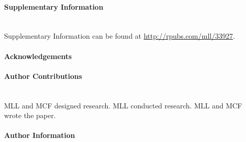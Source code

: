\documentclass[12pt]{article}
\renewcommand\refname{References and Notes}
\newcounter{lastnote}
\begin{document}
\renewcommand{\refname}{\normalsize References}



\paragraph*{Supplementary Information}\mbox{}\\
Supplementary Information can be found at \url{http://rpubs.com/mll/33927}.

\paragraph*{Acknowledgements}

\paragraph*{Author Contributions} \mbox{}\\
MLL and MCF designed research. MLL conducted research. MLL and MCF wrote the paper. 

\paragraph*{Author Information}







\clearpage
\end{document}

